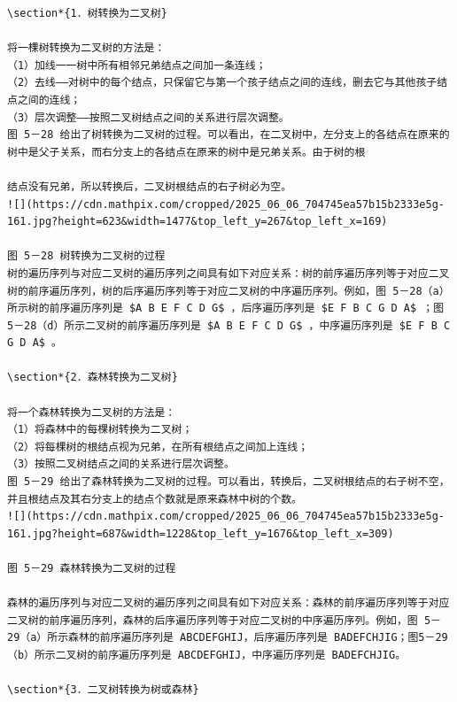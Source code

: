 \documentclass[10pt]{article}
\begin{document}
\begin{verbatim}
\section*{1．树转换为二叉树}

将一棵树转换为二叉树的方法是：
（1）加线一一树中所有相邻兄弟结点之间加一条连线；
（2）去线——对树中的每个结点，只保留它与第一个孩子结点之间的连线，删去它与其他孩子结点之间的连线；
（3）层次调整——按照二叉树结点之间的关系进行层次调整。
图 5－28 给出了树转换为二叉树的过程。可以看出，在二叉树中，左分支上的各结点在原来的树中是父子关系，而右分支上的各结点在原来的树中是兄弟关系。由于树的根

结点没有兄弟，所以转换后，二叉树根结点的右子树必为空。
![](https://cdn.mathpix.com/cropped/2025_06_06_704745ea57b15b2333e5g-161.jpg?height=623&width=1477&top_left_y=267&top_left_x=169)

图 5－28 树转换为二叉树的过程
树的遍历序列与对应二叉树的遍历序列之间具有如下对应关系：树的前序遍历序列等于对应二叉树的前序遍历序列，树的后序遍历序列等于对应二叉树的中序遍历序列。例如，图 5－28（a）所示树的前序遍历序列是 $A B E F C D G$ ，后序遍历序列是 $E F B C G D A$ ；图 5－28（d）所示二叉树的前序遍历序列是 $A B E F C D G$ ，中序遍历序列是 $E F B C G D A$ 。

\section*{2．森林转换为二叉树}

将一个森林转换为二叉树的方法是：
（1）将森林中的每棵树转换为二叉树；
（2）将每棵树的根结点视为兄弟，在所有根结点之间加上连线；
（3）按照二叉树结点之间的关系进行层次调整。
图 5－29 给出了森林转换为二叉树的过程。可以看出，转换后，二叉树根结点的右子树不空，并且根结点及其右分支上的结点个数就是原来森林中树的个数。
![](https://cdn.mathpix.com/cropped/2025_06_06_704745ea57b15b2333e5g-161.jpg?height=687&width=1228&top_left_y=1676&top_left_x=309)

图 5－29 森林转换为二叉树的过程

森林的遍历序列与对应二叉树的遍历序列之间具有如下对应关系：森林的前序遍历序列等于对应二叉树的前序遍历序列，森林的后序遍历序列等于对应二叉树的中序遍历序列。例如，图 5－29（a）所示森林的前序遍历序列是 ABCDEFGHIJ，后序遍历序列是 BADEFCHJIG；图5－29（b）所示二叉树的前序遍历序列是 ABCDEFGHIJ，中序遍历序列是 BADEFCHJIG。

\section*{3．二叉树转换为树或森林}


\end{verbatim}
\end{document}
